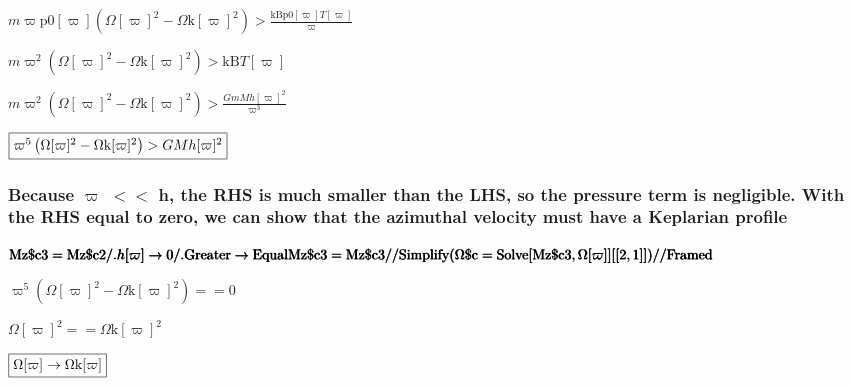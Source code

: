 \documentclass{article}
\begin{document}
\begin{doublespace}
\noindent\(m \varpi  \text{p0}[\varpi ] \left(\Omega [\varpi ]^2-\text{$\Omega $k}[\varpi ]^2\right)>\frac{\text{kB} \text{p0}[\varpi ] T[\varpi
]}{\varpi }\)
\end{doublespace}

\begin{doublespace}
\noindent\(m \varpi ^2 \left(\Omega [\varpi ]^2-\text{$\Omega $k}[\varpi ]^2\right)>\text{kB} T[\varpi ]\)
\end{doublespace}

\begin{doublespace}
\noindent\(m \varpi ^2 \left(\Omega [\varpi ]^2-\text{$\Omega $k}[\varpi ]^2\right)>\frac{G m M h[\varpi ]^2}{\varpi ^3}\)
\end{doublespace}

\begin{doublespace}
\noindent\(\fbox{$\varpi ^5 \left(\Omega [\varpi ]^2-\text{$\Omega $k}[\varpi ]^2\right)>G M h[\varpi ]^2$}\)
\end{doublespace}

\subsubsection*{Because $\varpi $ $<<$ h, the RHS is much smaller than the LHS, so the pressure term is negligible. With the RHS equal to zero, we
can show that the azimuthal velocity must have a Keplarian profile}

\begin{doublespace}
\noindent\(\pmb{\text{Mz$\$$c3} = \text{Mz$\$$c2} \text{/.} h[\varpi ]\to  0 \text{/.} \text{Greater} \to  \text{Equal}}\\
\pmb{\text{Mz$\$$c3} = \text{Mz$\$$c3} \text{//} \text{Simplify}}\\
\pmb{(\text{$\Omega \$$c} = \text{Solve}[\text{Mz$\$$c3},\Omega [\varpi ]][[2,1]]) \text{//}\text{Framed}}\)
\end{doublespace}

\begin{doublespace}
\noindent\(\varpi ^5 \left(\Omega [\varpi ]^2-\text{$\Omega $k}[\varpi ]^2\right)==0\)
\end{doublespace}

\begin{doublespace}
\noindent\(\Omega [\varpi ]^2==\text{$\Omega $k}[\varpi ]^2\)
\end{doublespace}

\begin{doublespace}
\noindent\(\fbox{$\Omega [\varpi ]\to \text{$\Omega $k}[\varpi ]$}\)
\end{doublespace}
\end{document}
